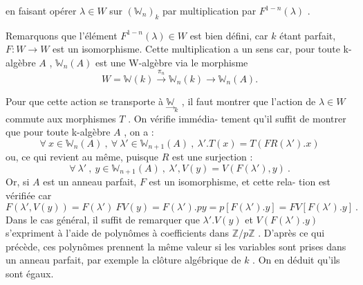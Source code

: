 en faisant opérer $\lambda \in W$ sur $(\mathbb{W}_n)_k$ par multiplication par $F^{1-n}(\lambda)$ .

Remarquons que l'élément $F^{1-n}(\lambda) \in W$ est bien défini, car
$k$ étant parfait, $F : W \to W$ est un isomorphisme. Cette multiplication
a un sens car, pour toute k-algèbre $A$ , $\mathbb{W}_n(A)$ est une W-algèbre via le
morphisme
\[ W = \mathbb{W}(k) \xrightarrow{\pi_n} \mathbb{W}_n(k) \to \mathbb{W}_n(A) . \]

Pour que cette action se transporte à $\underset{\rightarrow}{\mathbb{W}}_k$ , il faut montrer
que l'action de $\lambda \in W$ commute aux morphismes $T$ . On vérifie immédia-%
tement qu'il suffit de montrer que pour toute k-algèbre $A$ , on a :
\[ \forall\ x \in \mathbb{W}_n(A) \ , \ \forall\ \lambda' \in \mathbb{W}_{n+1}(A) \ , \ \lambda'.T(x) = T(FR(\lambda').x) \]
ou, ce qui revient au même, puisque $R$ est une surjection :
\[ \forall\ \lambda' \ , \ y \in \mathbb{W}_{n+1}(A) \ , \ \lambda',V(y) = V(F(\lambda'),y) \ . \]
Or, si $A$ est un anneau parfait, $F$ est un isomorphisme, et cette rela-%
tion est vérifiée car
\[ F(\lambda',V(y)) = F(\lambda')\ FV(y) = F(\lambda').py = p[F(\lambda').y] = FV[F(\lambda').y] \ . \]
Dans le cas général, il suffit de remarquer que $\lambda'.V(y)$ et $V(F(\lambda').y)$
s'expriment à l'aide de polynômes à coefficients dans $\mathbb{Z}/p\mathbb{Z}$ . D'après ce
qui précède, ces polynômes prennent la même valeur si les variables sont
prises dans un anneau parfait, par exemple la clôture algébrique de $k$ .
On en déduit qu'ils sont égaux.

